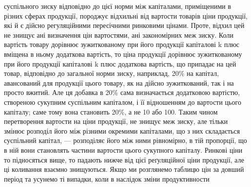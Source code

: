 суспільного зиску відповідно до цієї норми між капіталами, приміщеними в різних
сферах продукції, породжує відхильні від вартости товарів ціни продукції,
які й є дійсно регуляційними пересічними ринковими цінами. Проте, відхил цей
не знищує ані визначення цін вартостями, ані закономірних меж зиску. Коли
вартість товару дорівнює зужиткованому при його продукції капіталові k плюс
вміщена в ньому додаткова вартість, то ціна продукції дорівнює зужиткованому
при його продукції капіталові k плюс додаткова вартість, що припадає на цей
товар, відповідно до загальної норми зиску, наприклад, 20\% на капітал, авансований
для продукції цього товару, як на дійсно зужиткований, так і на просто
вжитий. Але ця добавка в 20\% сама визначається додатковою вартістю, створеною
сукупним суспільним капіталом, і її відношенням до вартости цього капіталу;
саме тому вона становить 20\%, а не 10 або 100. Таким чином перетворення
вартости на ціни продукції, не знищує меж зиску, але тільки змінює
розподіл його між різними окремими капіталами, що з них складається суспільний
капітал, — розподіляє його між ними рівномірно, в тій пропорції, що в ній
вони становлять частини вартости цього сукупного капіталу. Ринкові ціни
то підносяться вище, то падають нижче від цієї реґуляційної ціни продукції,
але ці коливання взаємно знищуються. Якщо ми розглянемо таблицю цін за
довший період та усунемо ті випадки, коли в наслідок зміни продуктивности
\parbreak{}  %
